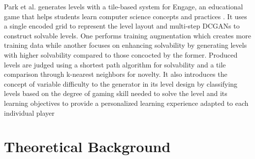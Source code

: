 \documentclass{Configuration_Files/PoliMi3i_thesis}
\begin{document}
Park et al. generates levels with a tile-based system for Engage, an educational game 
that helps students learn computer science concepts and practices \cite{KyP19}. It uses a single 
encoded grid to represent the level layout and multi-step DCGANs to construct
solvable levels. One performs training augmentation which creates more training 
data while another focuses on enhancing solvability by generating levels with higher 
solvability compared to those concocted by the former. Produced levels are judged 
using a shortest path algorithm for solvability and a tile comparison through k-nearest 
neighbors for novelty. It also introduces the concept of variable difficulty to 
the generator in its level design by classifying levels based on the degree of gaming 
skill needed to solve the level and its learning objectives to provide a personalized 
learning experience adapted to each individual player
\newpage

\section{Theoretical Background}
\end{document}
